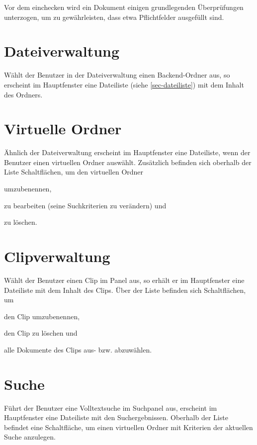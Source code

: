 Vor dem einchecken wird ein Dokument einigen grundlegenden Überprüfungen
unterzogen, um zu gewährleisten, dass etwa Pflichtfelder ausgefüllt sind.

\section{Dateiverwaltung} \label{sec-doclist}

Wählt der Benutzer in der Dateiverwaltung einen Backend-Ordner aus, so
erscheint im Hauptfenster eine Dateiliste (siehe \vref{sec-dateiliste})
mit dem Inhalt des Ordners.

\section{Virtuelle Ordner} \label{sec-virtfold}

Ähnlich der Dateiverwaltung erscheint im Hauptfenster eine Dateiliste, wenn
der Benutzer einen virtuellen Ordner auswählt. Zusätzlich befinden sich
oberhalb der Liste Schaltflächen, um den virtuellen Ordner
\begin{compactitem}
\item umzubenennen,
\item zu bearbeiten (seine Suchkriterien zu verändern) und
\item zu löschen.
\end{compactitem}

\section{Clipverwaltung} \label{sec-clipsdesktop}

Wählt der Benutzer einen Clip im Panel  aus, so
erhält er im Hauptfenster eine Dateiliste mit dem Inhalt des Clips. Über der
Liste befinden sich Schaltflächen, um
\begin{compactitem}
\item den Clip umzubenennen,
\item den Clip zu löschen und
\item alle Dokumente des Clips aus- bzw. abzuwählen.
\end{compactitem}

\section{Suche} \label{sec-suche}

Führt der Benutzer eine Volltextsuche im Suchpanel aus, erscheint im
Hauptfenster eine Dateiliste mit den Suchergebnissen. Oberhalb der Liste
befindet eine Schaltfläche, um einen virtuellen Ordner mit Kriterien der aktuellen Suche anzulegen.

